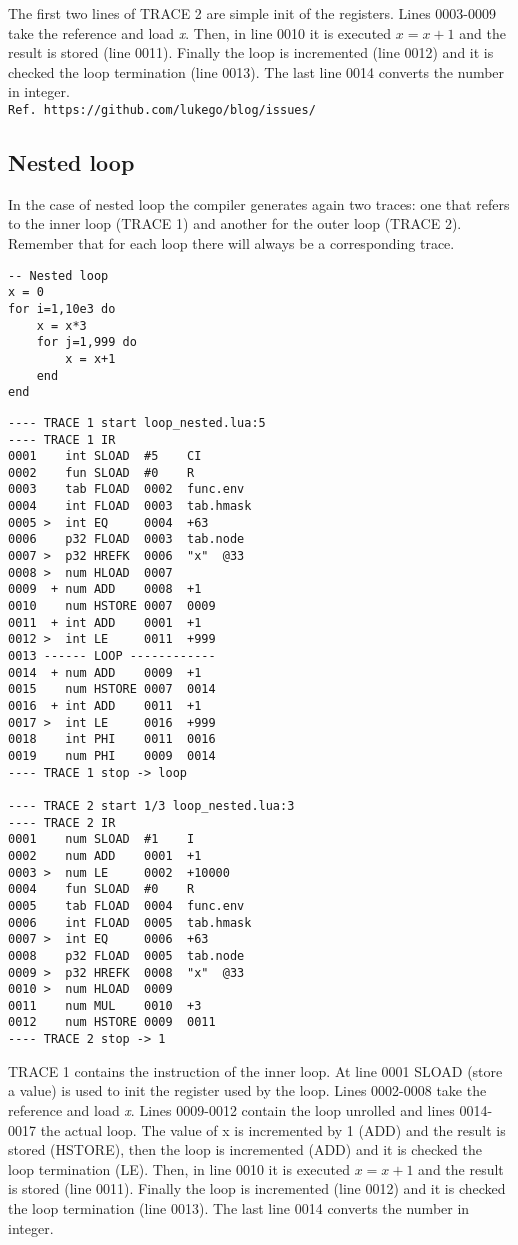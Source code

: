 The first two lines of TRACE 2 are simple init of the registers. Lines 0003-0009 take the reference and load \textit{x}. Then, in line 0010 it is executed $x=x+1$ and the result is stored (line 0011). Finally the loop is incremented (line 0012) and it is checked the loop termination (line 0013). The last line 0014 converts the number in integer.\\
\texttt{Ref. https://github.com/lukego/blog/issues/}\\

\subsection{Nested loop}
In the case of nested loop the compiler generates again two traces: one that refers to the inner loop (TRACE 1) and another for the outer loop (TRACE 2). Remember that for each loop there will always be a corresponding trace.
\begin{lstlisting}[style=LuaStyle]
-- Nested loop
x = 0
for i=1,10e3 do
	x = x*3
	for j=1,999 do
		x = x+1
	end
end
\end{lstlisting}

\begin{lstlisting}[style=DumpStyle]
---- TRACE 1 start loop_nested.lua:5
---- TRACE 1 IR
0001    int SLOAD  #5    CI
0002    fun SLOAD  #0    R
0003    tab FLOAD  0002  func.env
0004    int FLOAD  0003  tab.hmask
0005 >  int EQ     0004  +63 
0006    p32 FLOAD  0003  tab.node
0007 >  p32 HREFK  0006  "x"  @33
0008 >  num HLOAD  0007
0009  + num ADD    0008  +1  
0010    num HSTORE 0007  0009
0011  + int ADD    0001  +1  
0012 >  int LE     0011  +999
0013 ------ LOOP ------------
0014  + num ADD    0009  +1  
0015    num HSTORE 0007  0014
0016  + int ADD    0011  +1  
0017 >  int LE     0016  +999
0018    int PHI    0011  0016
0019    num PHI    0009  0014
---- TRACE 1 stop -> loop

---- TRACE 2 start 1/3 loop_nested.lua:3
---- TRACE 2 IR
0001    num SLOAD  #1    I
0002    num ADD    0001  +1  
0003 >  num LE     0002  +10000
0004    fun SLOAD  #0    R
0005    tab FLOAD  0004  func.env
0006    int FLOAD  0005  tab.hmask
0007 >  int EQ     0006  +63 
0008    p32 FLOAD  0005  tab.node
0009 >  p32 HREFK  0008  "x"  @33
0010 >  num HLOAD  0009
0011    num MUL    0010  +3  
0012    num HSTORE 0009  0011
---- TRACE 2 stop -> 1
\end{lstlisting}

TRACE 1 contains the instruction of the inner loop. At line 0001 SLOAD (store a value) is used to init the register used by the loop. Lines 0002-0008 take the reference and load \textit{x}. Lines 0009-0012 contain the loop unrolled and lines 0014-0017 the actual loop. The value of x is incremented by 1 (ADD) and the result is stored (HSTORE), then the loop is incremented (ADD) and  it is checked the loop termination (LE). Then, in line 0010 it is executed $x=x+1$ and the result is stored (line 0011). Finally the loop is incremented (line 0012) and it is checked the loop termination (line 0013). The last line 0014 converts the number in integer.

